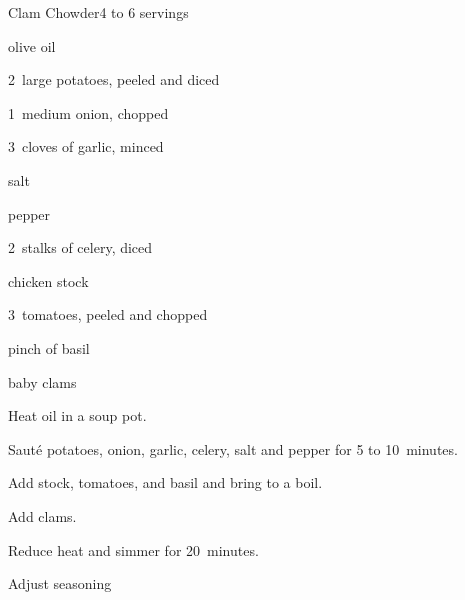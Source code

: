 \begin{recipe}{Clam Chowder}{}{4 to 6 servings}

\begin{ingredients}
\item {} olive oil
\item 2~large potatoes, peeled and diced
\item 1~medium onion, chopped
\item 3~cloves of garlic, minced
\item salt
\item pepper
\item 2~stalks of celery, diced
\item {} chicken stock
\item 3~tomatoes, peeled and chopped
\item pinch of basil
\item {} baby clams
\end{ingredients}

\begin{directions}
\item Heat oil in a soup pot.
\item Saut\'e potatoes, onion, garlic, celery, salt and pepper for 5 to 10~minutes.
\item Add stock, tomatoes, and basil and bring to a boil.
\item Add clams.
\item Reduce heat and simmer for 20~minutes.
\item Adjust seasoning
\end{directions}

\end{recipe}
